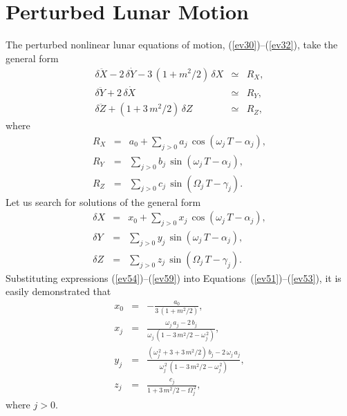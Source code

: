  \section{Perturbed Lunar Motion}
 The perturbed nonlinear lunar equations of motion, (\ref{ev30})--(\ref{ev32}), take the general form
 \begin{eqnarray}\label{ev51}
 \delta \ddot{X}-2\,\delta \dot{Y} - 3\,(1+m^2/2)\,\delta X &\simeq& R_X,\\[0.5ex]
 \delta \ddot{Y}+2\,\delta \dot{X} &\simeq&R_Y,\\[0.5ex]
 \delta\ddot{Z} + (1+3\,m^2/2)\,\delta Z &\simeq &R_Z,\label{ev53}
 \end{eqnarray}
 where 
 \begin{eqnarray}
 R_X &=& a_0 + \sum_{j>0}a_j\,\cos(\omega_j\,T-\alpha_j),\label{ev54}\\[0.5ex]
 R_Y &=&\sum_{j>0} b_j\,\sin(\omega_j\,T-\alpha_j),\\[0.5ex]
 R_Z &=& \sum_{j>0} c_j\,\sin(\Omega_j\,T-\gamma_j).\label{ev56}
 \end{eqnarray}
 Let us search for solutions of the general form
 \begin{eqnarray}
 \delta X &=& x_0 + \sum_{j>0}x_j\,\cos(\omega_j\,T-\alpha_j),\label{ev57}\\[0.5ex]
 \delta Y &=&\sum_{j>0} y_j\,\sin(\omega_j\,T-\alpha_j),\\[0.5ex]
 \delta Z &=&\sum_{j>0}z_j\,\sin(\Omega_j\,T-\gamma_j).\label{ev59}
 \end{eqnarray}
 Substituting expressions (\ref{ev54})--(\ref{ev59}) into Equations~(\ref{ev51})--(\ref{ev53}), it is easily demonstrated that
 \begin{eqnarray}\label{ev60}
 x_0 &=& -\frac{a_0}{3\,(1+m^2/2)},\\[0.5ex]
 x_j &=& \frac{\omega_j\,a_j-2\,b_j}{\omega_j\,(1-3\,m^2/2-\omega_j^{\,2})},\label{ev61}\\[0.5ex]
 y_j &=&\frac{(\omega_j^{\,2}+ 3+3\,m^2/2)\,b_j - 2\,\omega_j\,a_j}{\omega_j^{\,2}\,(1-3\,m^2/2-\omega_j^{\,2})},\label{ev62}\\[0.5ex]
 z_j &=& \frac{c_j}{1+3\,m^2/2-\Omega_j^{\,2}},\label{ev63}
 \end{eqnarray}
 where $j>0$. 
 
